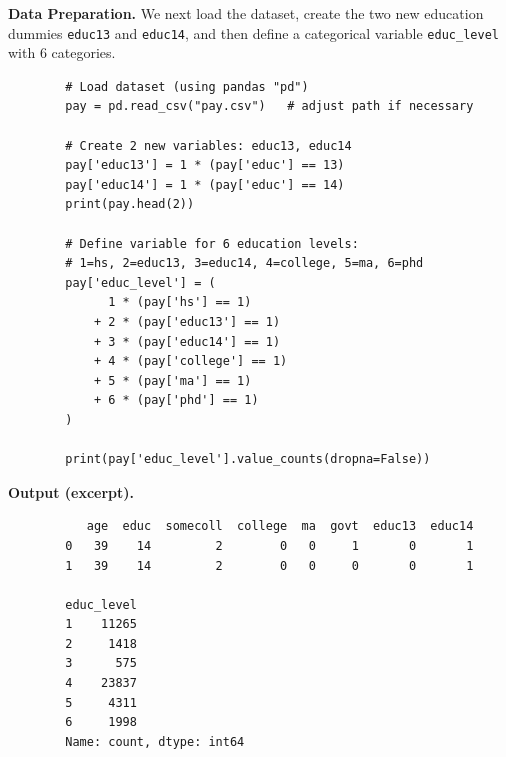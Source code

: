 \documentclass[12pt]{article}
\numberwithin{equation}{section}
\begin{document}
    \newpage
    \textbf{Data Preparation.} 
    We next load the dataset, create the two new education dummies \texttt{educ13} and \texttt{educ14}, 
    and then define a categorical variable \texttt{educ\_level} with 6 categories.
    
        \begin{verbatim}
        # Load dataset (using pandas "pd")
        pay = pd.read_csv("pay.csv")   # adjust path if necessary
        
        # Create 2 new variables: educ13, educ14
        pay['educ13'] = 1 * (pay['educ'] == 13)
        pay['educ14'] = 1 * (pay['educ'] == 14)
        print(pay.head(2))
        
        # Define variable for 6 education levels:
        # 1=hs, 2=educ13, 3=educ14, 4=college, 5=ma, 6=phd
        pay['educ_level'] = (
              1 * (pay['hs'] == 1)
            + 2 * (pay['educ13'] == 1)
            + 3 * (pay['educ14'] == 1)
            + 4 * (pay['college'] == 1)
            + 5 * (pay['ma'] == 1)
            + 6 * (pay['phd'] == 1)
        )
        
        print(pay['educ_level'].value_counts(dropna=False))
        \end{verbatim}
    
    \textbf{Output (excerpt).}
        \begin{verbatim}
           age  educ  somecoll  college  ma  govt  educ13  educ14
        0   39    14         2        0   0     1       0       1
        1   39    14         2        0   0     0       0       1
        
        educ_level
        1    11265
        2     1418
        3      575
        4    23837
        5     4311
        6     1998
        Name: count, dtype: int64
        \end{verbatim}
\end{document}
